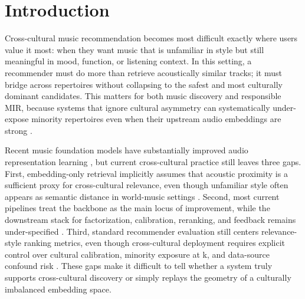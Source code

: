 \section{Introduction}
\label{sec:introduction}

Cross-cultural music recommendation becomes most difficult exactly where users value it most: when they want music that is unfamiliar in style but still meaningful in mood, function, or listening context. In this setting, a recommender must do more than retrieve acoustically similar tracks; it must bridge across repertoires without collapsing to the safest and most culturally dominant candidates. This matters for both music discovery and responsible MIR, because systems that ignore cultural asymmetry can systematically under-expose minority repertoires even when their upstream audio embeddings are strong \cite{holzapfel2018ethical,huang2023beyonddatasets,porcaro2021diversity}.

Recent music foundation models have substantially improved audio representation learning \cite{li2023mert,kanatas2025culturemert}, but current cross-cultural practice still leaves three gaps. First, embedding-only retrieval implicitly assumes that acoustic proximity is a sufficient proxy for cross-cultural relevance, even though unfamiliar style often appears as semantic distance in world-music settings \cite{kanatas2025culturemert,papaioannou2025universal}. Second, most current pipelines treat the backbone as the main locus of improvement, while the downstream stack for factorization, calibration, reranking, and feedback remains under-specified \cite{li2023mert,kanatas2025culturemert}. Third, standard recommender evaluation still centers relevance-style ranking metrics, even though cross-cultural deployment requires explicit control over cultural calibration, minority exposure at k, and data-source confound risk \cite{porcaro2021diversity,lee2025globalmood,huang2023beyonddatasets}. These gaps make it difficult to tell whether a system truly supports cross-cultural discovery or simply replays the geometry of a culturally imbalanced embedding space.

